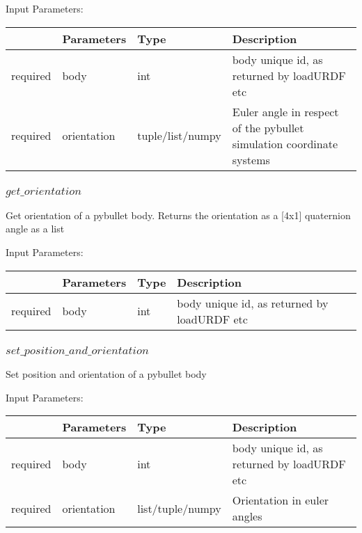 \documentclass[
	ngerman,
	accentcolor=9c,%
	type=intern,
	marginpar=false
	]{tudapub}
\begin{document}
\vspace{0.5cm}
\noindent Input Parameters:
\vspace{0.5cm}

\begin{tabular}{|p{}|p{}|p{}| p{}|}
\hline
 & \textbf{Parameters} & \textbf{Type} & \textbf{Description} \\
\hline
required & body & int & body unique id, as returned by loadURDF etc\\
\hline
required & orientation & tuple/list/numpy &  Euler angle in respect of the  pybullet simulation coordinate systems\\
\hline
\end{tabular}
\vspace{0.5cm}

\subsubsection{$get\_orientation$}
\noindent Get orientation of a pybullet body. Returns the orientation as a [4x1] quaternion angle as a list 


\vspace{0.5cm}
\noindent Input Parameters:
\vspace{0.5cm}

\begin{tabular}{|p{}|p{}|p{}| p{}|}
\hline
 & \textbf{Parameters} & \textbf{Type} & \textbf{Description} \\
\hline
required & body & int & body unique id, as returned by loadURDF etc\\
\hline
\end{tabular}
\vspace{0.5cm}



\subsubsection{$set\_position\_and\_orientation$}
\noindent Set position and orientation of a pybullet body


\vspace{0.5cm}
\noindent Input Parameters:
\vspace{0.5cm}

\begin{tabular}{|p{}|p{}|p{}| p{}|}
\hline
 & \textbf{Parameters} & \textbf{Type} & \textbf{Description} \\
\hline
required & body & int & body unique id, as returned by loadURDF etc\\
\hline
required & orientation & list/tuple/numpy & Orientation in euler angles\\
\hline
\end{tabular}
\vspace{0.5cm}
\end{document}
